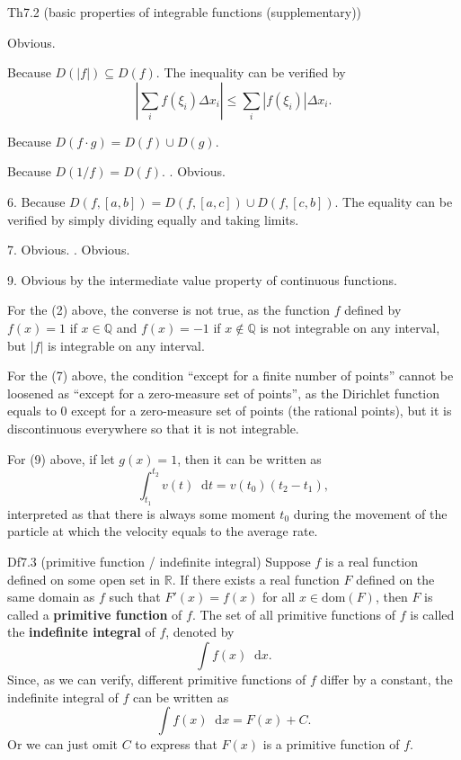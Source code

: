 \documentclass{article}
\newcommand{\dif}{\mathop{}\!\mathrm{d}}
\begin{document}
\begin{Th}{Th7.2 (basic properties of integrable functions (supplementary))}
    \begin{compactenum}
        \item Obvious.
        \item Because $D(|f|) \subseteq D(f)$. The inequality can be verified by
        $$ \left| \sum_{i} f(\xi_i)\Delta x_i \right| \leq \sum_{i} |f(\xi_i)|\Delta x_i. $$
        \item Because $D(f\cdot g) = D(f)\cup D(g)$.
        \item Because $D(1/f) = D(f)$. . Obvious.
        \item[6.] Because $D(f, [a, b]) = D(f, [a, c])\cup D(f, [c, b])$. The equality can be verified by simply dividing equally and taking limits.
        \item[7.] Obvious. . Obvious.
        \item[9.] Obvious by the intermediate value property of continuous functions.
    \end{compactenum}
\end{Th}

\begin{Rmk}{}
    \begin{compactenum}
        \item For the (2) above, the converse is not true, as the function $f$ defined by $f(x) = 1$ if $x\in\mathbb{Q}$ and $f(x) = -1$ if $x\notin\mathbb{Q}$ is not integrable on any interval, but $|f|$ is integrable on any interval.
        \item For the (7) above, the condition ``except for a finite number of points'' cannot be loosened as ``except for a zero-measure set of points'', as the Dirichlet function equals to $0$ except for a zero-measure set of points (the rational points), but it is discontinuous everywhere so that it is not integrable.
        \item For (9) above, if let $g(x) = 1$, then it can be written as
            $$\int_{t_1}^{t_2} v(t)\dif t = v(t_0)(t_2 - t_1),$$
        interpreted as that there is always some moment $t_0$ during the movement of the particle at which the velocity equals to the average rate.
    \end{compactenum}
\end{Rmk}

\begin{Df}{Df7.3 (primitive function / indefinite integral)}
    Suppose $f$ is a real function defined on some open set in $\mathbb{R}$. If there exists a real function $F$ defined on the same domain as $f$ such that $F'(x) = f(x)$ for all $x\in\text{dom}(F)$, then $F$ is called a \textbf{primitive function} of $f$. The set of all primitive functions of $f$ is called the \textbf{indefinite integral} of $f$, denoted by
    $$\int f(x)\dif x.$$
    \textcolor{Th}{Since, as we can verify, different primitive functions of $f$ differ by a constant}, the indefinite integral of $f$ can be written as
    $$\int f(x)\dif x = F(x) + C.$$
    Or we can just omit $C$ to express that $F(x)$ is a primitive function of $f$.
\end{Df}
\end{document}
